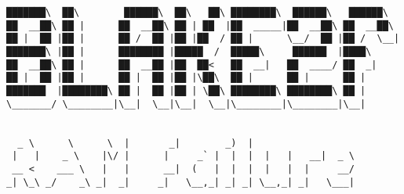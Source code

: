\documentclass[varwidth=\maxdimen,margin=0.5cm,multi={verbatim}]{standalone}
\begin{document}
\begin{verbatim}
███████\  ██\        ██████\  ██\   ██\ ████████\  ██████\   ██████\
██  __██\ ██ |      ██  __██\ ██ | ██  |██  _____|██  __██\ ██  __██\
██ |  ██ |██ |      ██ /  ██ |██ |██  / ██ |      \__/  ██ |██ /  \__|
███████\ |██ |      ████████ |█████  /  █████\     ██████  |████\
██  __██\ ██ |      ██  __██ |██  ██<   ██  __|   ██  ____/ ██  _|
██ |  ██ |██ |      ██ |  ██ |██ |\██\  ██ |      ██ |      ██ |
███████  |████████\ ██ |  ██ |██ | \██\ ████████\ ████████\ ██ |
\_______/ \________|\__|  \__|\__|  \__|\________|\________|\__|


  _ \      \      \  |       _|        _)  |
 |   |    _ \    |\/ |      |     _` |  |  |  |   |   __|  _ \
 __ <    ___ \   |   |      __|  (   |  |  |  |   |  |     __/
_| \_\ _/    _\ _|  _|     _|   \__,_| _| _| \__,_| _|   \___|



\end{verbatim}
\end{document}
